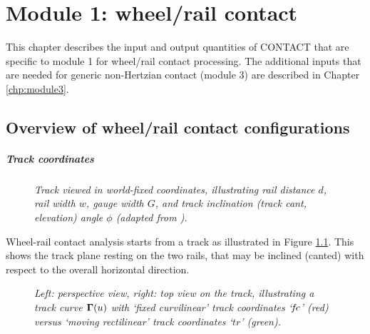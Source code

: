 \documentclass[12pt]{report}
\begin{document}

\chapter{Module 1: wheel/rail contact}
\label{chp:module1}

This chapter describes the input and output quantities of CONTACT that are
specific to module 1 for wheel/rail contact processing. The additional
inputs that are needed for generic non-Hertzian contact (module 3) are
described in Chapter \ref{chp:module3}.

\section{Overview of wheel/rail contact configurations}
\label{sec:wr_coords}

\paragraph{Track coordinates}

\begin{figure}[bt]
\centering
{}
\caption{\em Track viewed in world-fixed coordinates, illustrating rail
distance $d$, rail width $w$, gauge width $G$, and track inclination
(track cant, elevation) angle $\phi$ (adapted from \cite{Shabana2008}).}
\label{fig:world_coords}
\end{figure}

Wheel-rail contact analysis starts from a track as illustrated in Figure
\ref{fig:world_coords}. This shows the track plane resting on the two
rails, that may be inclined (canted) with respect to the overall horizontal
direction. 

\begin{figure}[bt]
\centering
{}
\caption{\em Left: perspective view, right: top view on the track,
        illustrating a track curve $\boldsymbol{\Gamma}(u)$ with `fixed curvilinear'
        track coordinates `$\mkern-2muf\mkern-2muc$' (red) versus `moving rectilinear' track
        coordinates `$tr$' (green).}
\label{fig:fc_coords}
\end{figure}
\end{document}
